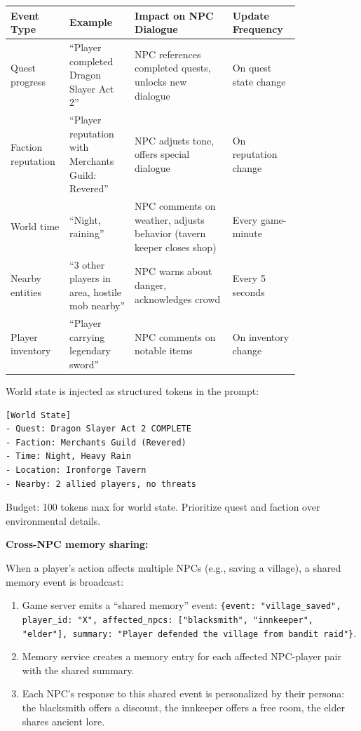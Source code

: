 \begin{tabular}{|p{0.12\linewidth}|p{0.2\linewidth}|p{0.3\linewidth}|p{0.2\linewidth}|}
\hline
\textbf{Event Type} & \textbf{Example} & \textbf{Impact on NPC Dialogue} & \textbf{Update Frequency} \\
\hline
Quest progress & ``Player completed Dragon Slayer Act 2'' & NPC references completed quests, unlocks new dialogue & On quest state change \\
\hline
Faction reputation & ``Player reputation with Merchants Guild: Revered'' & NPC adjusts tone, offers special dialogue & On reputation change \\
\hline
World time & ``Night, raining'' & NPC comments on weather, adjusts behavior (tavern keeper closes shop) & Every game-minute \\
\hline
Nearby entities & ``3 other players in area, hostile mob nearby'' & NPC warns about danger, acknowledges crowd & Every 5 seconds \\
\hline
Player inventory & ``Player carrying legendary sword'' & NPC comments on notable items & On inventory change \\
\hline
\end{tabular}

\bigskip
World state is injected as structured tokens in the prompt:

\begin{verbatim}
[World State]
- Quest: Dragon Slayer Act 2 COMPLETE
- Faction: Merchants Guild (Revered)
- Time: Night, Heavy Rain
- Location: Ironforge Tavern
- Nearby: 2 allied players, no threats
\end{verbatim}

Budget: 100 tokens max for world state. Prioritize quest and faction over environmental details.

\textbf{Cross-NPC memory sharing:}

When a player's action affects multiple NPCs (e.g., saving a village), a shared memory event is broadcast:

\begin{enumerate}
  \item Game server emits a ``shared memory'' event: \texttt{\{event: "village\_saved", player\_id: "X", affected\_npcs: ["blacksmith", "innkeeper", "elder"], summary: "Player defended the village from bandit raid"\}}.
  \item Memory service creates a memory entry for each affected NPC-player pair with the shared summary.
  \item Each NPC's response to this shared event is personalized by their persona: the blacksmith offers a discount, the innkeeper offers a free room, the elder shares ancient lore.
\end{enumerate}

